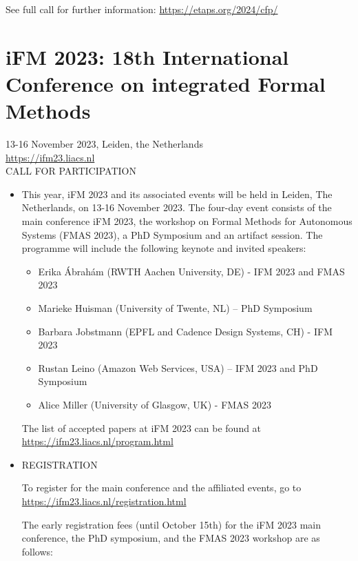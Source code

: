 \documentclass[prodmode,acmtecs]{acmsmall} %
\begin{document}
\begin{itemize}
  See full call for further information:  \href{https://etaps.org/2024/cfp/}{https://etaps.org/2024/cfp/} 
 
\end{itemize}\section{iFM 2023: 18th International Conference on integrated Formal Methods}\label{iFM2023}  13-16 November 2023, Leiden, the Netherlands\\ 
  \href{https://ifm23.liacs.nl}{https://ifm23.liacs.nl}\\ 
CALL FOR PARTICIPATION 

\begin{itemize}\item  This year, iFM 2023 and its associated events will be held in Leiden, The Netherlands, on 13-16 November 2023. The four-day event consists of the main conference iFM 2023, the workshop on Formal Methods for Autonomous Systems (FMAS 2023), a PhD Symposium and an artifact session. The programme will include the following keynote and invited speakers: 
 
\begin{itemize}\item  Erika Ábrahám (RWTH Aachen University, DE) - IFM 2023 and FMAS 2023
\item  Marieke Huisman (University of Twente, NL) – PhD Symposium
\item  Barbara Jobstmann (EPFL and Cadence Design Systems, CH) - IFM 2023
\item  Rustan Leino (Amazon Web Services, USA) – IFM 2023 and PhD Symposium
\item  Alice Miller (University of Glasgow, UK) - FMAS 2023
\end{itemize} 
  The list of accepted papers at iFM 2023 can be found at \href{https://ifm23.liacs.nl/program.html}{https://ifm23.liacs.nl/program.html} 
 
\item  REGISTRATION 
 
  To register for the main conference and the affiliated events, go to \href{https://ifm23.liacs.nl/registration.html}{https://ifm23.liacs.nl/registration.html} 
 
  The early registration fees (until October 15th) for the iFM 2023 main conference, the PhD symposium, and the FMAS 2023 workshop are as follows: 
 

\end{itemize}
\end{document}
